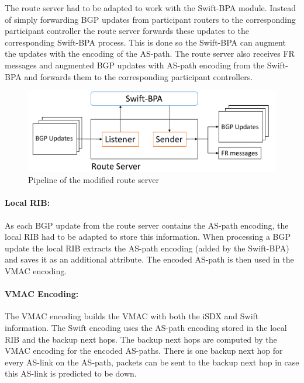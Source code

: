 The route server had to be adapted to work with the Swift-BPA module. 
Instead of simply forwarding BGP updates from participant routers to the corresponding participant controller the route server forwards these updates to the corresponding Swift-BPA process. This is done so the Swift-BPA can augment the updates with the encoding of the AS-path. The route server also receives FR messages and augmented BGP updates with AS-path encoding from the Swift-BPA and forwards them to the corresponding participant controllers. 
\begin{figure}[h]
\center
\includegraphics[scale = 0.45]{Figures/design_route_server_cropped2.pdf}
\caption{Pipeline of the modified route server}
\end{figure}


\paragraph{\label{chapter4:Changes to the iSDX:local RIB}Local RIB:}

As each BGP update from the route server contains the AS-path encoding, the local RIB had to be adapted to store this information. 
When processing a BGP update the local RIB extracts the AS-path encoding (added by the Swift-BPA) and saves it as an additional attribute. The encoded AS-path is then used in the VMAC encoding. 

\paragraph{\label{chapter4:Changes to the iSDX:Vmac Encoding}VMAC Encoding:}
The VMAC encoding builds the VMAC with both the iSDX and Swift information. The Swift encoding uses the AS-path encoding stored in the local RIB and the backup next hops. The backup next hops are computed by the VMAC encoding for the encoded AS-paths. There is one backup next hop for every AS-link on the AS-path, packets can be sent to the backup next hop in case this AS-link is predicted to be down. \\

\newpage
